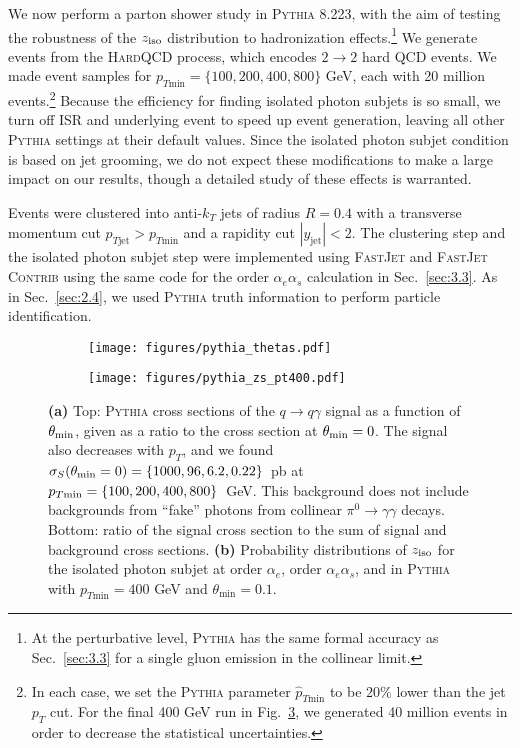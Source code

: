 \documentclass[a4paper,11pt]{article}
\DeclareRobustCommand{\Sec}[1]{Sec.~\ref{#1}}
\DeclareRobustCommand{\Fig}[1]{Fig.~\ref{#1}}
\newcommand{\ziso}{z_{\rm iso}}
\begin{document}
We now perform a parton shower study in \textsc{Pythia} 8.223, with the aim of testing the robustness of the $\ziso$ distribution to hadronization effects.\footnote{At the perturbative level, \textsc{Pythia} has the same formal accuracy as \Sec{sec:3.3} for a single gluon emission in the collinear limit.}
%
We generate events from the \textsc{HardQCD} process, which encodes $2\rightarrow2$ hard QCD events.
%
We made event samples for $p_{T\text{min}} = \{100, 200, 400, 800\}$ GeV, each with 20 million events.\footnote{In each case, we set the \textsc{Pythia} parameter $\hat{p}_{T\text{min}}$ to be $20\%$ lower than the jet $p_T$ cut. For the final 400 GeV run in \Fig{fig:pythia_splitting}, we generated 40 million events in order to decrease the statistical uncertainties.}
%
Because the efficiency for finding isolated photon subjets is so small, we turn off ISR and underlying event to speed up event generation, leaving all other \textsc{Pythia} settings at their default values.
%
Since the isolated photon subjet condition is based on jet grooming, we do not expect these modifications to make a large impact on our results, though a detailed study of these effects is warranted.  

Events were clustered into anti-$k_T$ jets of radius $R = 0.4$ with a transverse momentum cut $p_{T\text{jet}} > p_{T\text{min}}$ and a rapidity cut $|y_{\text{jet}}| < 2$.
%
The clustering step and the isolated photon subjet step were implemented using \textsc{FastJet} and \textsc{FastJet Contrib} using the same code for the order $\alpha_e \alpha_s$ calculation in \Sec{sec:3.3}. 
%
As in \Sec{sec:2.4}, we used \textsc{Pythia} truth information to perform particle identification.

\begin{figure}[t]
	\centering
	\begin{subfigure}[b]{0.47\textwidth}
	\centering
    \texttt{[image: figures/pythia\_thetas.pdf]}
    \caption{}
    \label{fig:5b}
	\end{subfigure}
	\hfill
	\begin{subfigure}[b]{0.47\textwidth}
	\centering
    \texttt{[image: figures/pythia\_zs\_pt400.pdf]}
    \caption{}
    \label{fig:pythia_splitting}
    \end{subfigure}
    \caption{\textbf{(a)} Top: \textsc{Pythia} cross sections of the $q \rightarrow q \gamma$ signal as a function of $\theta_{\rm min}$, given as a ratio to the cross section at $\theta_{\rm min} = 0$. The signal also decreases with $p_T$, and we found $\sigma_S(\theta_{\rm min} = 0) = \{1000, 96, 6.2, 0.22\}$~pb at $p_{T \rm min}= \{100, 200, 400, 800\}$~GeV. This background does not include backgrounds from ``fake'' photons from collinear $\pi^0 \rightarrow \gamma \gamma$ decays. Bottom: ratio of the signal cross section to the sum of signal and background cross sections. \textbf{(b)} Probability distributions of $\ziso$ for the isolated photon subjet at order $\alpha_e$, order $\alpha_e \alpha_s$, and in \textsc{Pythia} with $p_{T\text{min}} = 400$ GeV and $\theta_{\text{min}} = 0.1$. }
\end{figure}
\end{document}
